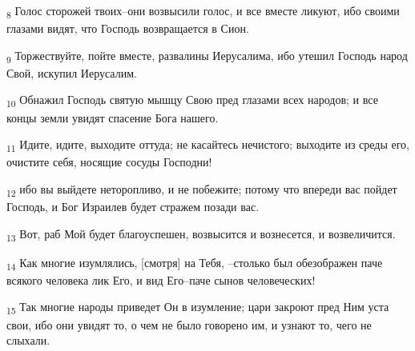 \begin{tcolorbox}
\textsubscript{8} Голос сторожей твоих--они возвысили голос, и все вместе ликуют, ибо своими глазами видят, что Господь возвращается в Сион.
\end{tcolorbox}
\begin{tcolorbox}
\textsubscript{9} Торжествуйте, пойте вместе, развалины Иерусалима, ибо утешил Господь народ Свой, искупил Иерусалим.
\end{tcolorbox}
\begin{tcolorbox}
\textsubscript{10} Обнажил Господь святую мышцу Свою пред глазами всех народов; и все концы земли увидят спасение Бога нашего.
\end{tcolorbox}
\begin{tcolorbox}
\textsubscript{11} Идите, идите, выходите оттуда; не касайтесь нечистого; выходите из среды его, очистите себя, носящие сосуды Господни!
\end{tcolorbox}
\begin{tcolorbox}
\textsubscript{12} ибо вы выйдете неторопливо, и не побежите; потому что впереди вас пойдет Господь, и Бог Израилев будет стражем позади вас.
\end{tcolorbox}
\begin{tcolorbox}
\textsubscript{13} Вот, раб Мой будет благоуспешен, возвысится и вознесется, и возвеличится.
\end{tcolorbox}
\begin{tcolorbox}
\textsubscript{14} Как многие изумлялись, [смотря] на Тебя, --столько был обезображен паче всякого человека лик Его, и вид Его--паче сынов человеческих!
\end{tcolorbox}
\begin{tcolorbox}
\textsubscript{15} Так многие народы приведет Он в изумление; цари закроют пред Ним уста свои, ибо они увидят то, о чем не было говорено им, и узнают то, чего не слыхали.
\end{tcolorbox}
